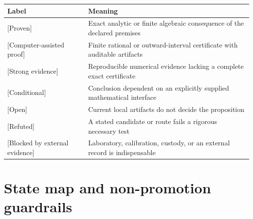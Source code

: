 \documentclass[11pt,a4paper,openany]{report}
\newcommand{\statusProven}{\textcolor{fingreen}{[Proven]}}
\newcommand{\statusStrong}{\textcolor{finblue}{[Strong evidence]}}
\newcommand{\statusRefuted}{\textcolor{finred}{[Refuted]}}
\begin{document}
\begin{center}
\begingroup\small
\setlength{\tabcolsep}{2.5pt}
\renewcommand{\arraystretch}{1.16}
\begin{longtable}{@{}p{}p{}@{}}
\toprule
\textbf{Label} & \textbf{Meaning} \\
\midrule
\endhead
\statusProven{} & Exact analytic or finite algebraic consequence of the declared premises \\
\textcolor{fingreen}{[Computer-assisted proof]} & Finite rational or outward-interval certificate with auditable artifacts \\
\statusStrong{} & Reproducible numerical evidence lacking a complete exact certificate \\
\textcolor{finviolet}{[Conditional]} & Conclusion dependent on an explicitly supplied mathematical interface \\
\textcolor{finorange}{[Open]} & Current local artifacts do not decide the proposition \\
\statusRefuted{} & A stated candidate or route fails a rigorous necessary test \\
\textcolor{finred}{[Blocked by external evidence]} & Laboratory, calibration, custody, or an external record is indispensable \\
\bottomrule
\end{longtable}
\endgroup
\end{center}

\chapter{State map and non-promotion guardrails}
\end{document}
